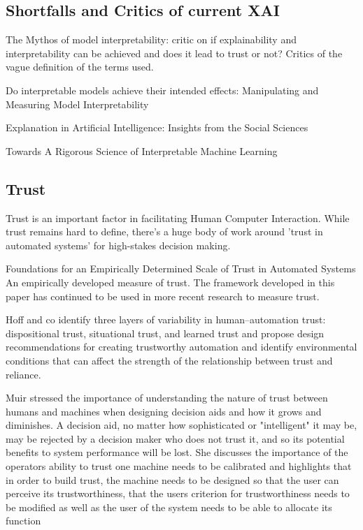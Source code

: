 \documentclass[manuscript,screen,review]{acmart}
\begin{document}
\subsection{Shortfalls and Critics of current XAI}
The Mythos of model interpretability\cite{Lipton2018}: critic on if explainability and interpretability can be achieved and does it lead to trust or not? Critics of the vague definition of the terms used.

Do interpretable models achieve their intended effects: Manipulating and Measuring Model Interpretability\cite{Goldstein2021}

Explanation in Artificial Intelligence: Insights from the Social Sciences\cite{Miller2019}

Towards A Rigorous Science of Interpretable Machine Learning\cite{Doshi-Velez2017}


\subsection{Trust}
Trust is an important factor in facilitating Human Computer Interaction.
While trust remains hard to define, there's a huge body of work around 'trust in automated systems' for high-stakes decision making.

Foundations for an Empirically Determined Scale of Trust in Automated Systems\cite{Jian2000}
An empirically developed measure of trust. The framework developed in this paper has continued to be used in more recent research to measure trust.

Hoff and co identify three layers of variability in human–automation trust: dispositional trust, situational trust, and learned trust and
propose design recommendations for creating trustworthy automation and identify environmental conditions that can affect the strength of the relationship between trust and reliance.\cite{Hoff2015}

Muir stressed the importance of understanding the nature of trust between humans and machines when designing decision aids and
how it grows and diminishes.
A decision aid, no matter how sophisticated or "intelligent" it may be, may be rejected
by a decision maker who does not trust it, and so its potential benefits to system
performance will be lost.
She discusses the importance of the operators ability to trust one machine needs to be calibrated and highlights that in order to build trust, the machine needs to be designed so that the user can perceive its
trustworthiness, that the users criterion for trustworthiness needs to be modified as well as the user of the system needs to be able
to allocate its function\cite{Muir1987}
\end{document}

